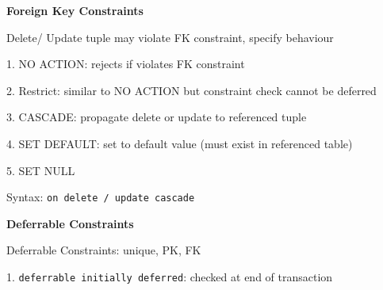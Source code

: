 \documentclass[10pt, a4paper]{article}
\newcommand{\highlight}[1]{{\color{red}\textbf{#1}}}
\newcommand{\tab}[0]{\hspace*{2mm}}
\begin{document}
\begin{multicols*}{3}


		








		\textbf{Foreign Key Constraints}

		Delete/ Update tuple may violate FK constraint, specify behaviour

		1. NO ACTION: rejects if violates FK constraint

		2. Restrict: similar to NO ACTION but constraint check cannot be deferred

		3. CASCADE: propagate delete or update to referenced tuple

		4. SET DEFAULT: set to default value (must exist in referenced table)

		5. SET NULL

		Syntax: \texttt{on delete / update cascade}



		\textbf{Deferrable Constraints}

		Deferrable Constraints: unique, PK, FK

		1. \texttt{deferrable initially deferred}: checked at end of transaction


\end{multicols*}
\end{document}
